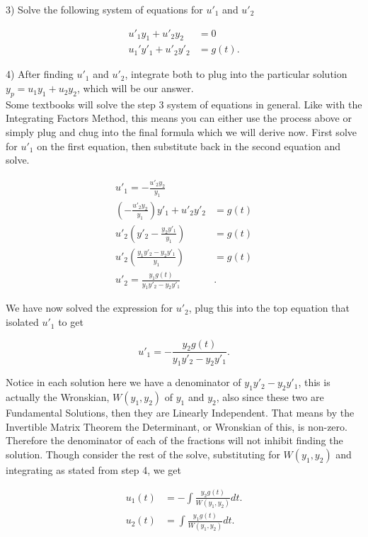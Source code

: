 \documentclass[12pt]{article}
\begin{document}
3) Solve the following system of equations for $u'_1$ and $u'_2$ 

\begin{align*}
    u'_1y_1+u'_2y_2&=0 \\
    u_1'y'_1+u'_2y'_2&=g(t).
\end{align*}

4) After finding $u'_1$ and $u'_2$, integrate both to plug into the particular solution $y_p=u_1y_1+u_2y_2$, which will be our answer. \\

Some textbooks will solve the step 3 system of equations in general. Like with the Integrating Factors Method, this means you can either use the process above or simply plug and chug into the final formula which we will derive now. First solve for $u'_1$ on the first equation, then substitute back in the second equation and solve.

\begin{align*}
    u'_1 = -\frac{u'_2y_2}{y_1}& \\
    \left(-\frac{u'_2y_2}{y_1}\right) y'_1 + u'_2y'_2&=g(t) \\
    u'_2 \left(y'_2-\frac{y_2y'_1}{y_1} \right) &=g(t) \\
    u'_2 \left(\frac{y_1y'_2-y_2y'_1}{y_1} \right) &=g(t) \\
    u'_2 = \frac{y_1g(t)}{y_1y'_2-y_2y'_1}&.
\end{align*}

We have now solved the expression for $u'_2$, plug this into the top equation that isolated $u'_1$ to get

\begin{equation*}
    u'_1 = -\frac{y_2g(t)}{y_1y'_2-y_2y'_1}.
\end{equation*}

Notice in each solution here we have a denominator of $y_1y'_2-y_2y'_1$, this is actually the Wronskian, $W(y_1,y_2)$ of $y_1$ and $y_2$, also since these two are Fundamental Solutions, then they are Linearly Independent. That means by the Invertible Matrix Theorem the Determinant, or Wronskian of this, is non-zero. Therefore the denominator of each of the fractions will not inhibit finding the solution. Though consider the rest of the solve, substituting for $W(y_1,y_2)$ and integrating as stated from step 4, we get

\begin{align*}
    u_1(t) &= -\int \frac{y_2g(t)}{W(y_1,y_2)} dt. \\
    u_2(t) &= \int \frac{y_1g(t)}{W(y_1,y_2)} dt.
\end{align*}
\end{document}
